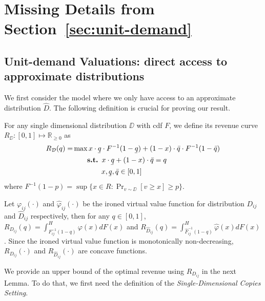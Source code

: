 \section{Missing Details from Section~\ref{sec:unit-demand}}\label{sec:unit-demand appx}
\subsection{Unit-demand Valuations: direct access to approximate distributions}\label{sec:unit-demand Kolmogorov}
We first consider the model where we only have access to an approximate distribution $\hat{D}$. The following definition is crucial for proving our result. 

\begin{definition}
For any single dimensional distribution $\DD$ with cdf $F$, we define its revenue curve $R_{\DD}: [0,1]\mapsto \mathbb{R}_{\geq 0}$ as
	\begin{align*}
	{R}_{\DD} (q) = &\max  x\cdot \ubar{q}\cdot {F}^{-1}(1-\ubar{q}) +(1-x)\cdot \bar{q}\cdot {F}^{-1}(1-\bar{q})\\
	& \qquad\textbf{s.t. } x\cdot \ubar{q}+(1-x)\cdot \bar{q}=q\\
	&  \qquad\qquad x, \ubar{q}, \bar{q} \in [0,1]
\end{align*}
where $F^{-1}(1-p) = \sup\{x\in R: \Pr_{v\sim \DD}[v\geq x]\geq p\}$.
\end{definition}


\begin{lemma}[Folklore]
	Let ${\varphi}_{ij}(\cdot)$ and $\hat{\varphi}_{ij}(\cdot)$ be the ironed virtual value function for distribution $D_{ij}$ and $\hat{D}_{ij}$ respectively, then for any $q\in [0,1]$, ${R}_{D_{ij}}(q) = \int_{{F}^{-1}_{ij}(1-q)}^H {\varphi}(x) dF(x)$ and $R_{\hat{D}_{ij}}(q) = \int_{\hat{F}^{-1}_{ij}(1-q)}^H \hat{\varphi}(x) dF(x)$. Since the ironed virtual value function is monotonically non-decreasing, ${R}_{D_{ij}}(\cdot)$ and $R_{\hat{D}_{ij}}(\cdot)$ are concave functions. 
\end{lemma}

We provide an upper bound of the optimal revenue using $R_{D_{ij}}$ in the next Lemma. To do that, we first need the definition of the \emph{Single-Dimensional Copies Setting}.

